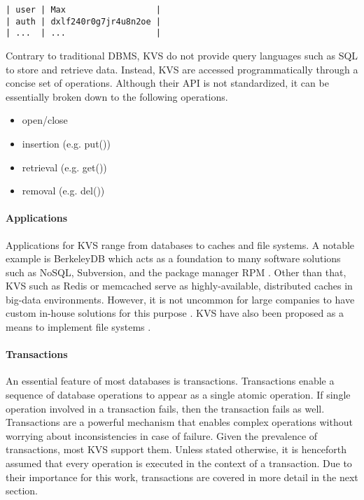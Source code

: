 \begin{lstlisting}
| user | Max                  |
| auth | dxlf240r0g7jr4u8n2oe |
| ...  | ...                  |
\end{lstlisting}

Contrary to traditional DBMS, KVS do not provide query languages such as SQL to
store and retrieve data. Instead, KVS are accessed programmatically through a
concise set of operations. Although their API is not standardized, it can be
essentially broken down to the following operations.

\begin{itemize}
    \item open/close
    \item insertion (e.g. put())
    \item retrieval (e.g. get())
    \item removal (e.g. del())
\end{itemize}

\paragraph{Applications}

Applications for KVS range from databases to caches and file systems. A notable
example is BerkeleyDB which acts as a foundation to many software solutions such
as NoSQL, Subversion, and the package manager RPM \cite{?}. Other than that, KVS
such as Redis or memcached serve as highly-available, distributed caches in
big-data environments. However, it is not uncommon for large companies to have
custom in-house solutions for this purpose \cite{chang2008bigtable,
decandia2007dynamo, lakshman2010cassandra, wang2015hydradb}. KVS have also been
proposed as a means to implement file systems \cite{murphy2001database,
volos2014aerie}.


\paragraph{Transactions}

An essential feature of most databases is transactions. Transactions enable a
sequence of database operations to appear as a single atomic operation. If
single operation involved in a transaction fails, then the transaction fails as
well. Transactions are a powerful mechanism that enables complex operations
without worrying about inconsistencies in case of failure. Given the prevalence
of transactions, most KVS support them. Unless stated otherwise, it is
henceforth assumed that every operation is executed in the context of a
transaction. Due to their importance for this work, transactions are covered in
more detail in the next section.

